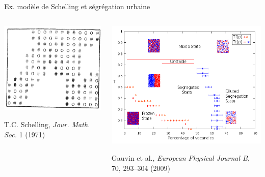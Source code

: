 \documentclass[ignorenonframetext]{beamer}
\begin{document}
\begin{frame}{Ex. modèle de Schelling et ségrégation urbaine}

\begin{columns}
	\begin{column}{0.5\textwidth}
		\includegraphics[width=\textwidth]{img/Schelling1.png}
		
		{\small T.C. Schelling, \textit{Jour. Math. Soc.} 1 (1971)}
	\end{column}
	\begin{column}{0.5\textwidth}
		\includegraphics[width=\textwidth]{img/Schelling2.png}
		
		{\small Gauvin et al., \textit{European Physical Journal B}, 70, 293–304 (2009)}
	\end{column}
\end{columns}

\end{frame}
\end{document}
